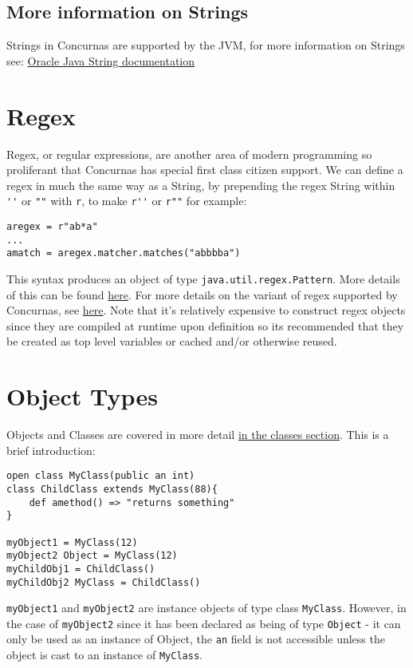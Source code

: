 \documentclass[conc-doc]{subfiles}
\begin{document}
\subsection{More information on Strings}
Strings in Concurnas are supported by the JVM, for more information on Strings see: \href{https://docs.oracle.com/javase/tutorial/java/data/strings.html}{Oracle Java String documentation}

\section{Regex}
Regex, or regular expressions, are another area of modern programming so proliferant that Concurnas has special first class citizen support. We can define a regex in much the same way as a String, by prepending the regex String within \lstinline{''} or \lstinline{""} with \lstinline{r}, to make \lstinline{r''} or \lstinline{r""} for example:
\begin{lstlisting}
aregex = r"ab*a"
...
amatch = aregex.matcher.matches("abbbba")
\end{lstlisting}

This syntax produces an object of type \lstinline{java.util.regex.Pattern}. More details of this can be found \href{https://docs.oracle.com/en/java/javase/12/docs/api/java.base/java/util/regex/Pattern.html}{here}. For more details on the variant of regex supported by Concurnas, see \href{https://docs.oracle.com/en/java/javase/12/docs/api/java.base/java/util/regex/Pattern.html}{here}. Note that it's relatively expensive to construct regex objects since they are compiled at runtime upon definition so its recommended that they be created as top level variables or cached and/or otherwise reused.

\section{Object Types}
Objects and Classes are covered in more detail \hyperref[ch:classes]{in the classes section}. This is a brief introduction:

\begin{lstlisting}
open class MyClass(public an int)
class ChildClass extends MyClass(88){
	def amethod() => "returns something"
}

myObject1 = MyClass(12)
myObject2 Object = MyClass(12)
myChildObj1 = ChildClass()
myChildObj2 MyClass = ChildClass()
\end{lstlisting}

\lstinline{myObject1} and \lstinline{myObject2} are instance objects of type class \lstinline{MyClass}. However, in the case of \lstinline{myObject2} since it has been declared as being of type \lstinline{Object} - it can only be used as an instance of Object, the \lstinline{an} field is not accessible unless the object is cast to an instance of \lstinline{MyClass}.
\end{document}
